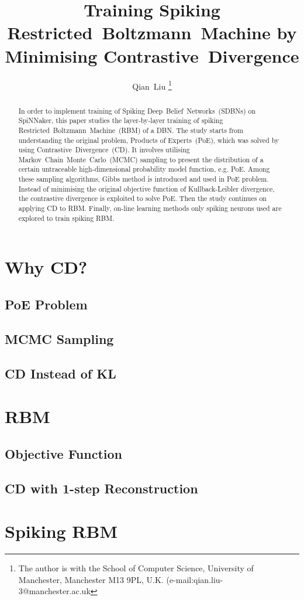 \documentclass[11pt,twoside,a4paper]{article}
\begin{document}
\title{Training Spiking Restricted~Boltzmann~Machine by Minimising Contrastive~Divergence}
\author{
Qian~Liu
\thanks{
The author is with the School of Computer Science, University of Manchester, Manchester M13 9PL, U.K. 
(e-mail:qian.liu-3@manchester.ac.uk}
}
\maketitle
\thispagestyle{empty}

\begin{abstract}
In order to implement training of Spiking Deep~Belief~Networks~(SDBNs) on SpiNNaker, this paper studies the layer-by-layer training of spiking Restricted~Boltzmann~Machine~(RBM) of a DBN.
The study starts from understanding the original problem, Products of Experts~(PoE), which was solved by using Contrastive~Divergence~(CD).
It involves utilising Markov~Chain~Monte~Carlo~(MCMC) sampling to present the distribution of a certain untraceable high-dimensional probability model function, e.g. PoE.
Among these sampling algorithms, Gibbs method is introduced and used in PoE problem.
Instead of minimising the original objective function of Kullback-Leibler divergence, the contrastive divergence is exploited to solve PoE.
Then the study continues on applying CD to RBM.
Finally, on-line learning methods only spiking neurons used are explored to train spiking RBM.

\end{abstract}
\section{Why CD?\cite{hinton2002training,woodfordnotes}}
\subsection{PoE Problem}
\subsection{MCMC Sampling}
\subsection{CD Instead of KL}
\section{RBM\cite{zhang2013rbm}}
\subsection{Objective Function}
\subsection{CD with 1-step Reconstruction}
\section{Spiking RBM\cite{neftci2013event}}

 

\end{document}
